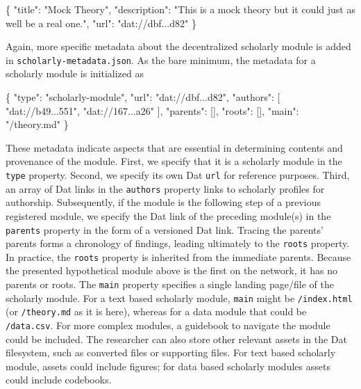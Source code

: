 \documentclass[a5paper]{book}
\newenvironment{Shaded}{\begin{snugshade}}{\end{snugshade}}
\newcommand{\DataTypeTok}[1]{\textcolor[rgb]{0.13,0.29,0.53}{#1}}
\newcommand{\StringTok}[1]{\textcolor[rgb]{0.31,0.60,0.02}{#1}}
\newcommand{\OtherTok}[1]{\textcolor[rgb]{0.56,0.35,0.01}{#1}}
\newcommand{\FunctionTok}[1]{\textcolor[rgb]{0.00,0.00,0.00}{#1}}
\begin{document}
\begin{Shaded}
\begin{Highlighting}[]
\FunctionTok{\{}
  \DataTypeTok{"title"}\FunctionTok{:} \StringTok{"Mock Theory"}\FunctionTok{,}
  \DataTypeTok{"description"}\FunctionTok{:} \StringTok{"This is a mock theory but it could just as well }
\StringTok{    be a real one."}\FunctionTok{,}
  \DataTypeTok{"url"}\FunctionTok{:} \StringTok{"dat://dbf...d82"}
\FunctionTok{\}}
\end{Highlighting}
\end{Shaded}

Again, more specific metadata about the decentralized scholarly module
is added in \texttt{scholarly-metadata.json}. As the bare minimum, the
metadata for a scholarly module is initialized as

\begin{Shaded}
\begin{Highlighting}[]
\FunctionTok{\{}
  \DataTypeTok{"type"}\FunctionTok{:} \StringTok{"scholarly-module"}\FunctionTok{,}
  \DataTypeTok{"url"}\FunctionTok{:} \StringTok{"dat://dbf...d82"}\FunctionTok{,}
  \DataTypeTok{"authors"}\FunctionTok{:} \OtherTok{[}
    \StringTok{"dat://b49...551"}\OtherTok{,}
    \StringTok{"dat://167...a26"}
  \OtherTok{]}\FunctionTok{,}
  \DataTypeTok{"parents"}\FunctionTok{:} \OtherTok{[]}\FunctionTok{,}
  \DataTypeTok{"roots"}\FunctionTok{:} \OtherTok{[]}\FunctionTok{,}
  \DataTypeTok{"main"}\FunctionTok{:} \StringTok{"/theory.md"}
\FunctionTok{\}}
\end{Highlighting}
\end{Shaded}

These metadata indicate aspects that are essential in determining
contents and provenance of the module. First, we specify that it is a
scholarly module in the \texttt{type} property. Second, we specify its
own Dat \texttt{url} for reference purposes. Third, an array of Dat
links in the \texttt{authors} property links to scholarly profiles for
authorship. Subsequently, if the module is the following step of a
previous registered module, we specify the Dat link of the preceding
module(s) in the \texttt{parents} property in the form of a versioned
Dat link. Tracing the parents' parents forms a chronology of findings,
leading ultimately to the \texttt{roots} property. In practice, the
\texttt{roots} property is inherited from the immediate parents. Because
the presented hypothetical module above is the first on the network, it
has no parents or roots. The \texttt{main} property specifies a single
landing page/file of the scholarly module. For a text based scholarly
module, \texttt{main} might be \texttt{/index.html} (or
\texttt{/theory.md} as it is here), whereas for a data module that could
be \texttt{/data.csv}. For more complex modules, a guidebook to navigate
the module could be included. The researcher can also store other
relevant assets in the Dat filesystem, such as converted files or
supporting files. For text based scholarly module, assets could include
figures; for data based scholarly modules assets could include
codebooks.
\end{document}
